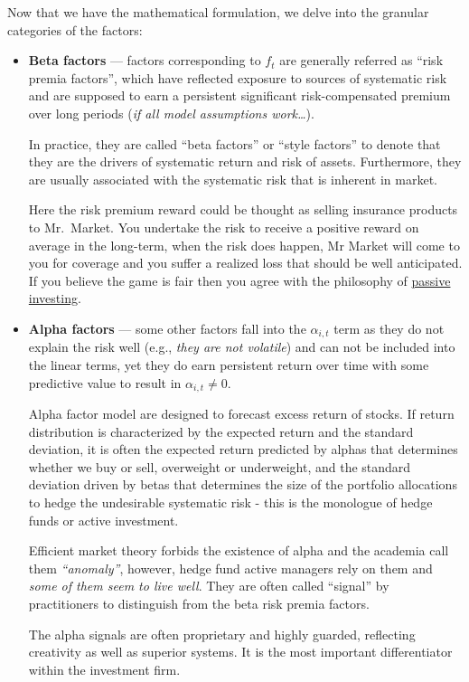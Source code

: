 \documentclass[
]{book}
\begin{document}
Now that we have the mathematical formulation, we delve into the granular categories of the factors:

\begin{itemize}
\item
  \textbf{Beta factors} --- factors corresponding to \(f_t\) are generally referred as ``risk premia factors'', which have reflected exposure to sources of systematic risk and are supposed to earn a persistent significant risk-compensated premium over long periods ({\emph{if all model assumptions work\ldots{}}}).

  In practice, they are called ``beta factors'' or ``style factors'' to denote that they are the drivers of systematic return and risk of assets. Furthermore, they are usually associated with the systematic risk that is inherent in market.

  Here the risk premium reward could be thought as selling insurance products to Mr.~Market. You undertake the risk to receive a positive reward on average in the long-term, when the risk does happen, Mr Market will come to you for coverage and you suffer a realized loss that should be well anticipated. If you believe the game is fair then you agree with the philosophy of \href{https://www.investopedia.com/terms/p/passiveinvesting.asp}{passive investing}.
\item
  \textbf{Alpha factors} --- some other factors fall into the \(\alpha_{i,t}\) term as they do not explain the risk well (e.g., {\emph{they are not volatile}}) and can not be included into the linear terms, yet they do earn persistent return over time with some predictive value to result in \(\alpha_{i,t} \neq 0\).

  Alpha factor model are designed to forecast excess return of stocks. If return distribution is characterized by the expected return and the standard deviation, it is often the expected return predicted by alphas that determines whether we buy or sell, overweight or underweight, and the standard deviation driven by betas that determines the size of the portfolio allocations to hedge the undesirable systematic risk - this is the monologue of hedge funds or active investment.

  Efficient market theory forbids the existence of alpha and the academia call them {\emph{``anomaly''}}, however, hedge fund active managers rely on them and {\emph{some of them seem to live well}}. They are often called ``signal'' by practitioners to distinguish from the beta risk premia factors.

  The alpha signals are often proprietary and highly guarded, reflecting creativity as well as superior systems. It is the most important differentiator within the investment firm.
\end{itemize}
\end{document}
